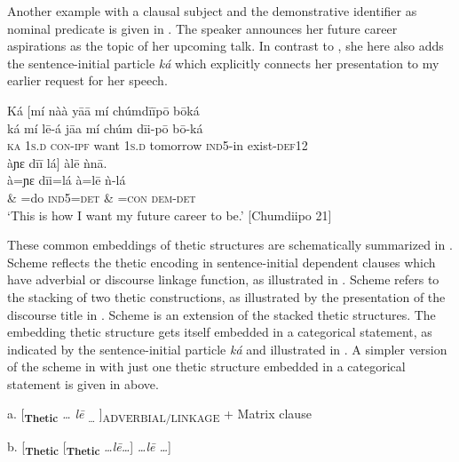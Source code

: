 \documentclass[output=paper]{langsci/langscibook}
\begin{document}
Another example with a clausal subject and the demonstrative identifier as nominal predicate is given in . The speaker announces her future career aspirations as the topic of her upcoming talk. In contrast to , she here also adds the sentence-initial particle \textit{ká }which explicitly connects her presentation to my earlier request for her speech.

\ea
\glll \textup{}  Ká  \textup{[}mí    nàà    y\={a}\={a}    mí    chúmd\={i}\={i}p\={o}            b\={o}ká\\
  \textup{  ká   mí    l\={e}-á      j\={a}a    mí    chúm        d\={i}i-p\={o}    b\={o}-ká}\\
     \textsc{  ka}   1\textsc{s.d}  \textsc{con-ipf}    want  1\textsc{s}.\textsc{d  }tomorrow     \textsc{ind}5-in     exist-\textsc{def}12\\
\glll   àɲɛ    d\={i}\={i}   lá\textup{]    }àl\={e}    ǹn\={a}.\\
  \textup{  à=ɲɛ  d\={i}i=lá    à=l\={e}    ǹ-lá}\\
       \& =do  \textsc{ind}\textsc{5=}\textsc{det}\textsc{  \& =}\textsc{con}\textsc{  }\textsc{dem-det}\\
\glt ‘This is how I want my future career to be.’ [Chumdiipo 21]\\

\z

These common embeddings of thetic structures are schematically summarized in . Scheme  reflects the thetic encoding in sentence-initial dependent clauses which have adverbial or discourse linkage function, as illustrated in . Scheme  refers to the stacking of two thetic constructions, as illustrated by the presentation of the discourse title in . Scheme  is an extension of the stacked thetic structures. The embedding thetic structure gets itself embedded in a categorical statement, as indicated by the sentence-initial particle \textit{ká }and illustrated in . A simpler version of the scheme in  with just one thetic structure embedded in a categorical statement is given in  above. 

\ea
{a.  [\textbf{\textsubscript{Thetic}} \textit{… l\={e}}\textsubscript{ … }]\textsubscript{ADVERBIAL/LINKAGE} + Matrix clause }

    b.   [\textbf{\textsubscript{Thetic}}\textsubscript{  }[\textbf{\textsubscript{Thetic}} \textit{…l\={e}…}] \textit{…l\={e} …}]
\end{document}
